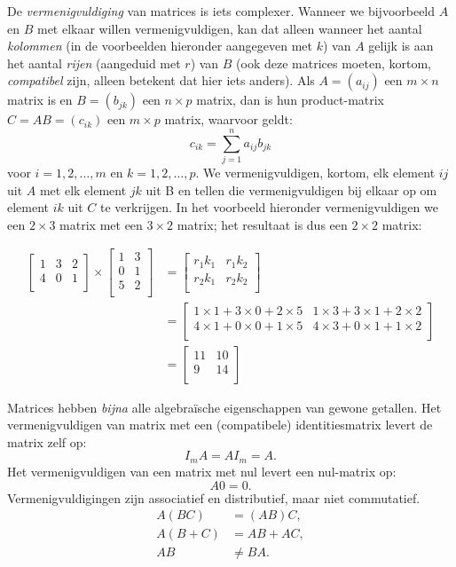 De \textit{vermenigvuldiging} van matrices is iets complexer. Wanneer we bijvoorbeeld $A$ en $B$ met elkaar willen vermenigvuldigen, kan dat alleen wanneer het aantal \textit{kolommen} (in de voorbeelden hieronder aangegeven met $k$) van $A$ gelijk is aan het aantal \textit{rijen} (aangeduid met $r$) van $B$ (ook deze matrices moeten, kortom, \textit{compatibel} zijn, alleen betekent dat hier iets anders). Als $A=(a_{ij})$ een $m \times n$ matrix is en $B=(b_{jk})$ een $n \times p$ matrix, dan is hun product-matrix $C=AB=(c_{ik})$ een $m \times p$ matrix, waarvoor geldt:
%
\[
c_{ik} = \sum_{j=1}^n{a_{ij}b_{jk}}
\]
%
voor $i=1,2,\hdots,m$ en $k=1, 2, \hdots, p$. We vermenigvuldigen, kortom, elk element $ij$ uit $A$ met elk element $jk$ uit B en tellen die vermenigvuldigen bij elkaar op om element $ik$ uit $C$ te verkrijgen. In het voorbeeld hieronder vermenigvuldigen we een $2 \times 3$ matrix met een $3 \times 2$ matrix; het resultaat is dus een $2 \times 2$ matrix:


\[
\begin{aligned}
\begin{bmatrix}
1 & 3 & 2 \\
4 & 0 & 1 \\
\end{bmatrix} \times
\begin{bmatrix} 
1 & 3 \\
0 & 1 \\
5 & 2 \\
\end{bmatrix} &=
\begin{bmatrix}
r_1k_1 & r_1k_2 \\
r_2k_1 & r_2k_2 \\
\end{bmatrix} \\
&=
\begin{bmatrix}
1 \times 1 + 3 \times 0 + 2 \times 5 & 1 \times 3 + 3 \times 1 + 2 \times 2 \\
4 \times 1 + 0 \times 0 + 1 \times 5 & 4 \times 3 + 0 \times 1 + 1 \times 2 \\
\end{bmatrix} \\
&= 
\begin{bmatrix}
11 & 10 \\
9 & 14 \\
\end{bmatrix}
\end{aligned}
\]

Matrices hebben \textit{bijna} alle algebraïsche eigenschappen van gewone getallen. Het vermenigvuldigen van matrix met een (compatibele) identitiesmatrix levert de matrix zelf op:
%
\[
I_mA = AI_m = A.
\]
%
Het vermenigvuldigen van een matrix met nul levert een nul-matrix op:
%
\[
A0 = 0.
\]
%
Vermenigvuldigingen zijn associatief en distributief, maar niet commutatief.
%
\[
\begin{aligned}
A(BC) &= (AB)C,\\
A(B+C) &= AB + AC, \\
AB &\neq BA.
\end{aligned}
\]
%

